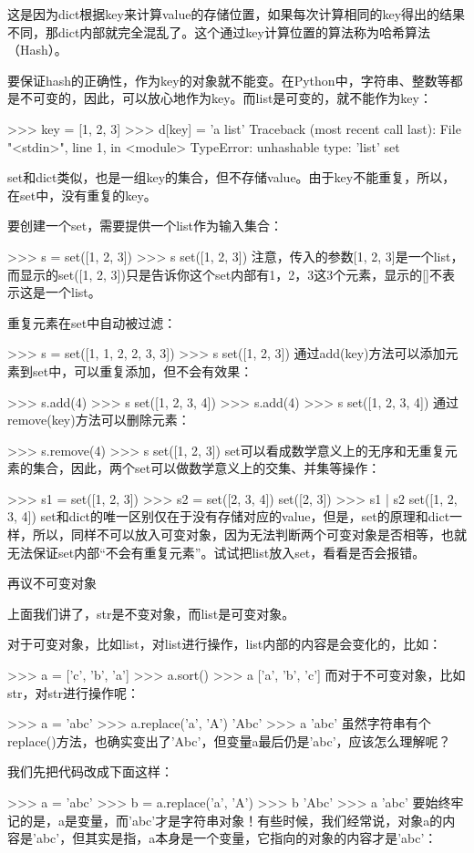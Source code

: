 这是因为dict根据key来计算value的存储位置，如果每次计算相同的key得出的结果不同，那dict内部就完全混乱了。这个通过key计算位置的算法称为哈希算法（Hash）。

要保证hash的正确性，作为key的对象就不能变。在Python中，字符串、整数等都是不可变的，因此，可以放心地作为key。而list是可变的，就不能作为key：

>>> key = [1, 2, 3]
>>> d[key] = 'a list'
Traceback (most recent call last):
  File "<stdin>", line 1, in <module>
TypeError: unhashable type: 'list'
set

set和dict类似，也是一组key的集合，但不存储value。由于key不能重复，所以，在set中，没有重复的key。

要创建一个set，需要提供一个list作为输入集合：

>>> s = set([1, 2, 3])
>>> s
set([1, 2, 3])
注意，传入的参数[1, 2, 3]是一个list，而显示的set([1, 2, 3])只是告诉你这个set内部有1，2，3这3个元素，显示的[]不表示这是一个list。

重复元素在set中自动被过滤：

>>> s = set([1, 1, 2, 2, 3, 3])
>>> s
set([1, 2, 3])
通过add(key)方法可以添加元素到set中，可以重复添加，但不会有效果：

>>> s.add(4)
>>> s
set([1, 2, 3, 4])
>>> s.add(4)
>>> s
set([1, 2, 3, 4])
通过remove(key)方法可以删除元素：

>>> s.remove(4)
>>> s
set([1, 2, 3])
set可以看成数学意义上的无序和无重复元素的集合，因此，两个set可以做数学意义上的交集、并集等操作：

>>> s1 = set([1, 2, 3])
>>> s2 = set([2, 3, 4])
set([2, 3])
>>> s1 | s2
set([1, 2, 3, 4])
set和dict的唯一区别仅在于没有存储对应的value，但是，set的原理和dict一样，所以，同样不可以放入可变对象，因为无法判断两个可变对象是否相等，也就无法保证set内部“不会有重复元素”。试试把list放入set，看看是否会报错。

再议不可变对象

上面我们讲了，str是不变对象，而list是可变对象。

对于可变对象，比如list，对list进行操作，list内部的内容是会变化的，比如：

>>> a = ['c', 'b', 'a']
>>> a.sort()
>>> a
['a', 'b', 'c']
而对于不可变对象，比如str，对str进行操作呢：

>>> a = 'abc'
>>> a.replace('a', 'A')
'Abc'
>>> a
'abc'
虽然字符串有个replace()方法，也确实变出了'Abc'，但变量a最后仍是'abc'，应该怎么理解呢？

我们先把代码改成下面这样：

>>> a = 'abc'
>>> b = a.replace('a', 'A')
>>> b
'Abc'
>>> a
'abc'
要始终牢记的是，a是变量，而'abc'才是字符串对象！有些时候，我们经常说，对象a的内容是'abc'，但其实是指，a本身是一个变量，它指向的对象的内容才是'abc'：

